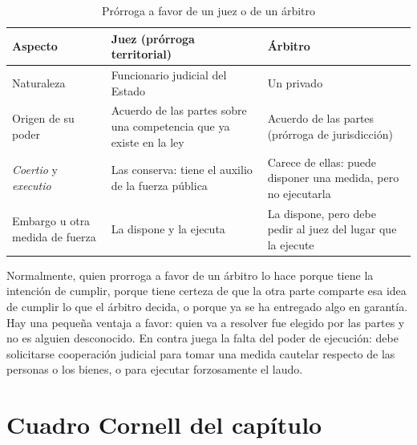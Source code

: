 \documentclass[12pt,oneside]{book}
\begin{document}
\begin{table}[H]
\centering
\caption{Prórroga a favor de un juez o de un árbitro}
\small
\begin{tabularx}{\textwidth}{>{\raggedright\arraybackslash}p{}YY}
\toprule
\textbf{Aspecto} & \textbf{Juez (prórroga territorial)} & \textbf{Árbitro} \\
\midrule
Naturaleza & Funcionario judicial del Estado & Un privado \\
Origen de su poder & Acuerdo de las partes sobre una competencia que ya existe en la ley & Acuerdo de las partes (prórroga de jurisdicción) \\
\textit{Coertio} y \textit{executio} & Las conserva: tiene el auxilio de la fuerza pública & Carece de ellas: puede disponer una medida, pero no ejecutarla \\
Embargo u otra medida de fuerza & La dispone y la ejecuta & La dispone, pero debe pedir al juez del lugar que la ejecute \\
\bottomrule
\end{tabularx}
\end{table}

Normalmente, quien prorroga a favor de un árbitro lo hace porque tiene la intención de cumplir, porque tiene certeza de que la otra parte comparte esa idea de cumplir lo que el árbitro decida, o porque ya se ha entregado algo en garantía. Hay una pequeña ventaja a favor: quien va a resolver fue elegido por las partes y no es alguien desconocido. En contra juega la falta del poder de ejecución: debe solicitarse cooperación judicial para tomar una medida cautelar respecto de las personas o los bienes, o para ejecutar forzosamente el laudo.

\section{Cuadro Cornell del capítulo}
\end{document}
